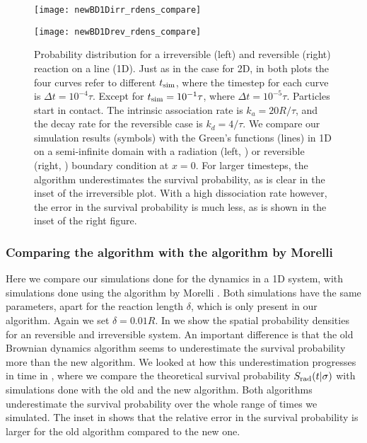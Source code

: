 \begin{figure}[hb]
\begin{minipage}[ht]{.5\linewidth}
\centering
\texttt{[image: newBD1Dirr\_rdens\_compare]}
\end{minipage}
\begin{minipage}[ht]{.5\linewidth}
\centering
\texttt{[image: newBD1Drev\_rdens\_compare]}
\end{minipage}
\caption{ Probability distribution for a irreversible (left) and reversible (right) reaction on a line (1D). Just as in the case for 2D, in both plots the four curves refer to different $t_{\rm sim}$, where the timestep for each curve is $\Delta t = 10^{-4} \tau$. Except for $t_{\rm sim}=10^{-1}\tau$, where $\Delta t=10^{-5}\tau$. Particles start in contact. The intrinsic association rate is $k_a=20 R/\tau$, and the decay rate for the reversible case is $k_d=4/\tau$. We compare our simulation results (symbols) with the Green's functions (lines) in 1D on a semi-infinite domain with a radiation (left, \cite{Beck1992}) or reversible (right, \cite{Agmon1984,Kim2001}) boundary condition at $x=0$. For larger timesteps, the algorithm underestimates the survival probability, as is clear in the inset of the irreversible plot. With a high dissociation rate however, the error in the survival probability is much less, as is shown in the inset of the right figure.}
\end{figure}

\subsubsection{Comparing the algorithm with the algorithm by Morelli}
Here we compare our simulations done for the dynamics in a 1D system, with simulations done using the algorithm by Morelli \cite{Morelli2008a}. Both simulations have the same parameters, apart for the reaction length $\delta$, which is only present in our algorithm. Again we set $\delta=0.01R$. In  we show the spatial probability densities for an reversible and irreversible system. An important difference is that the old Brownian dynamics algorithm seems to underestimate the survival probability more than the new algorithm. We looked at how this underestimation progresses in time in , where we compare the theoretical survival probability $S_{\rm rad}(t|\sigma)$ with simulations done with the old and the new algorithm. Both algorithms underestimate the survival probability over the whole range of times we simulated. The inset in  shows that the relative error in the survival probability is larger for the old algorithm compared to the new one.

